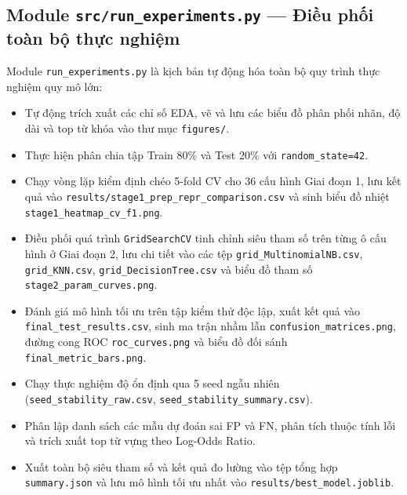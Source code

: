 \subsection{Module \texttt{src/run\_experiments.py} --- Điều phối toàn bộ thực nghiệm}
Module \texttt{run\_experiments.py} là kịch bản tự động hóa toàn bộ quy trình thực nghiệm quy mô lớn:
\begin{itemize}
    \item Tự động trích xuất các chỉ số EDA, vẽ và lưu các biểu đồ phân phối nhãn, độ dài và top từ khóa vào thư mục \texttt{figures/}.
    \item Thực hiện phân chia tập Train 80\% và Test 20\% với \texttt{random\_state=42}.
    \item Chạy vòng lặp kiểm định chéo 5-fold CV cho 36 cấu hình Giai đoạn 1, lưu kết quả vào \texttt{results/stage1\_prep\_repr\_comparison.csv} và sinh biểu đồ nhiệt \texttt{stage1\_heatmap\_cv\_f1.png}.
    \item Điều phối quá trình \texttt{GridSearchCV} tinh chỉnh siêu tham số trên từng ô cấu hình ở Giai đoạn 2, lưu chi tiết vào các tệp \texttt{grid\_MultinomialNB.csv}, \texttt{grid\_KNN.csv}, \texttt{grid\_DecisionTree.csv} và biểu đồ tham số \texttt{stage2\_param\_curves.png}.
    \item Đánh giá mô hình tối ưu trên tập kiểm thử độc lập, xuất kết quả vào \texttt{final\_test\_results.csv}, sinh ma trận nhầm lẫn \texttt{confusion\_matrices.png}, đường cong ROC \texttt{roc\_curves.png} và biểu đồ đối sánh \texttt{final\_metric\_bars.png}.
    \item Chạy thực nghiệm độ ổn định qua 5 seed ngẫu nhiên (\texttt{seed\_stability\_raw.csv}, \texttt{seed\_stability\_summary.csv}).
    \item Phân lập danh sách các mẫu dự đoán sai FP và FN, phân tích thuộc tính lỗi và trích xuất top từ vựng theo Log-Odds Ratio.
    \item Xuất toàn bộ siêu tham số và kết quả đo lường vào tệp tổng hợp \texttt{summary.json} và lưu mô hình tối ưu nhất vào \texttt{results/best\_model.joblib}.
\end{itemize}

